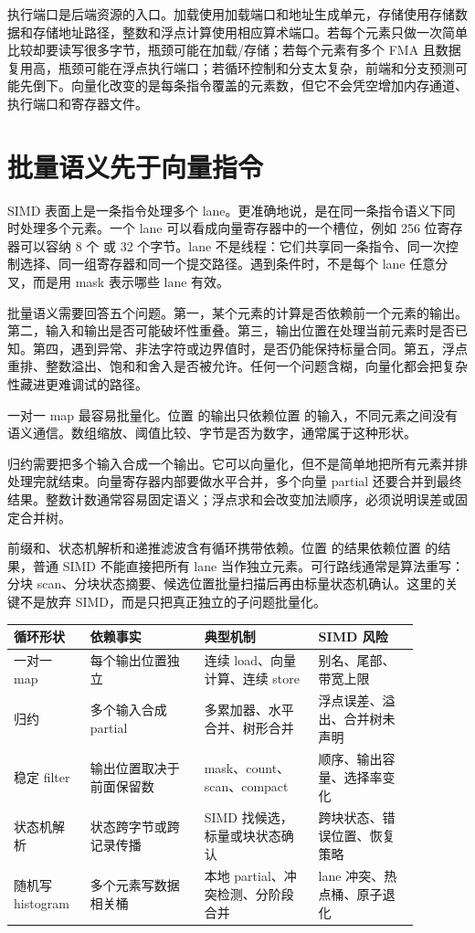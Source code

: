执行端口是后端资源的入口。加载使用加载端口和地址生成单元，存储使用存储数据和存储地址路径，整数和浮点计算使用相应算术端口。若每个元素只做一次简单比较却要读写很多字节，瓶颈可能在加载/存储；若每个元素有多个 FMA 且数据复用高，瓶颈可能在浮点执行端口；若循环控制和分支太复杂，前端和分支预测可能先倒下。向量化改变的是每条指令覆盖的元素数，但它不会凭空增加内存通道、执行端口和寄存器文件。

\section{批量语义先于向量指令}

SIMD 表面上是一条指令处理多个 lane。更准确地说，是在同一条指令语义下同时处理多个元素。一个 lane 可以看成向量寄存器中的一个槽位，例如 256 位寄存器可以容纳 8 个  或 32 个字节。lane 不是线程：它们共享同一条指令、同一次控制选择、同一组寄存器和同一个提交路径。遇到条件时，不是每个 lane 任意分叉，而是用 mask 表示哪些 lane 有效。

批量语义需要回答五个问题。第一，某个元素的计算是否依赖前一个元素的输出。第二，输入和输出是否可能破坏性重叠。第三，输出位置在处理当前元素时是否已知。第四，遇到异常、非法字符或边界值时，是否仍能保持标量合同。第五，浮点重排、整数溢出、饱和和舍入是否被允许。任何一个问题含糊，向量化都会把复杂性藏进更难调试的路径。

一对一 map 最容易批量化。位置  的输出只依赖位置  的输入，不同元素之间没有语义通信。数组缩放、阈值比较、字节是否为数字，通常属于这种形状。

归约需要把多个输入合成一个输出。它可以向量化，但不是简单地把所有元素并排处理完就结束。向量寄存器内部要做水平合并，多个向量 partial 还要合并到最终结果。整数计数通常容易固定语义；浮点求和会改变加法顺序，必须说明误差或固定合并树。

前缀和、状态机解析和递推滤波含有循环携带依赖。位置  的结果依赖位置  的结果，普通 SIMD 不能直接把所有 lane 当作独立元素。可行路线通常是算法重写：分块 scan、分块状态摘要、候选位置批量扫描后再由标量状态机确认。这里的关键不是放弃 SIMD，而是只把真正独立的子问题批量化。

\begin{center}
\begin{tabular}{@{}p{0.16\linewidth}p{0.25\linewidth}p{0.25\linewidth}p{0.22\linewidth}@{}}
\toprule
循环形状 & 依赖事实 & 典型机制 & SIMD 风险 \\
\midrule
一对一 map & 每个输出位置独立 & 连续 load、向量计算、连续 store & 别名、尾部、带宽上限 \\
归约 & 多个输入合成 partial & 多累加器、水平合并、树形合并 & 浮点误差、溢出、合并树未声明 \\
稳定 filter & 输出位置取决于前面保留数 & mask、count、scan、compact & 顺序、输出容量、选择率变化 \\
状态机解析 & 状态跨字节或跨记录传播 & SIMD 找候选，标量或块状态确认 & 跨块状态、错误位置、恢复策略 \\
随机写 histogram & 多个元素写数据相关桶 & 本地 partial、冲突检测、分阶段合并 & lane 冲突、热点桶、原子退化 \\
\bottomrule
\end{tabular}
\end{center}

